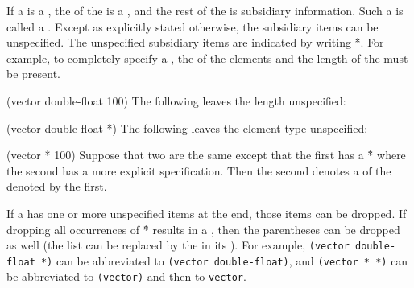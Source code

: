 
\indent               
If a  is a , the  of the  
is a , and the rest of the  is subsidiary
 information.  Such a  is called 
a .
Except as explicitly stated otherwise,
the subsidiary items can be unspecified.
The unspecified subsidiary items are indicated
by writing \f{*}.  For example, to completely specify
a , the  of the elements
and the length of the  must be present.

\code
 (vector double-float 100)
\endcode
The following leaves the length unspecified:

\code
 (vector double-float *)
\endcode
The following leaves the element type unspecified:

\code
 (vector * 100)                                      
\endcode
Suppose that two  are the same except that the first
has a \f{*} where the second has a more explicit specification.
Then the second denotes a  
of the  denoted by the first.

If a  has one or more unspecified items at the end, 
those items can be dropped.
If dropping all occurrences of \f{*} results in a  ,
then the parentheses can be dropped as well (the list can be replaced
by the  in its ).  
For example,                       
{\tt (vector double-float *)}                    
can be abbreviated to {\tt (vector double-float)},               
and {\tt (vector * *)} can be abbreviated to {\tt (vector)} 
and then to 
{\tt vector}.


